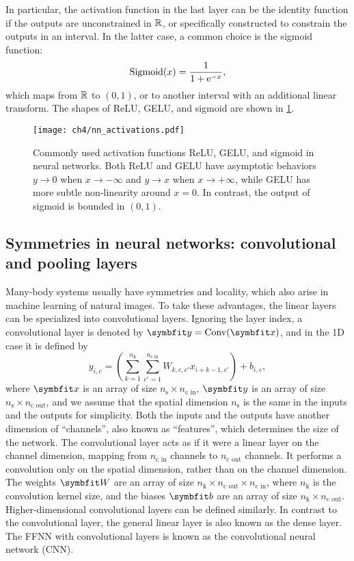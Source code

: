 In particular, the activation function in the last layer can be the identity function if the outputs are unconstrained in $\mathbb{R}$, or specifically constructed to constrain the outputs in an interval. In the latter case, a common choice is the sigmoid function:
\begin{equation}
\text{Sigmoid}(x) = \frac{1}{1 + \mathrm{e}^{-x}},
\label{eq:sigmoid}
\end{equation}
which maps from $\mathbb{R}$ to $(0, 1)$, or to another interval with an additional linear transform. The shapes of ReLU, GELU, and sigmoid are shown in \cref{fig:activations}.

\begin{figure}[htb]
\centering
\texttt{[image: ch4/nn\_activations.pdf]}
\caption[Commonly used activation functions in neural networks]{
Commonly used activation functions ReLU, GELU, and sigmoid in neural networks.
Both ReLU and GELU have asymptotic behaviors $y \to 0$ when $x \to -\infty$ and $y \to x$ when $x \to +\infty$, while GELU has more subtle non-linearity around $x = 0$.
In contrast, the output of sigmoid is bounded in $(0, 1)$.
}
\label{fig:activations}
\end{figure}

\subsection{Symmetries in neural networks: convolutional and pooling layers}

Many-body systems usually have symmetries and locality, which also arise in machine learning of natural images. To take these advantages, the linear layers can be specialized into convolutional layers. Ignoring the layer index, a convolutional layer is denoted by $\vy = \text{Conv}(\vx)$, and in the 1D case it is defined by
\begin{equation}
y_{i, c} = \left( \sum_{k = 1}^{n_\text{k}} \sum_{c' = 1}^{n_\text{c in}} W_{k, c, c'} x_{i + k - 1, c'} \right) + b_{i, c},
\label{eq:conv-layer}
\end{equation}
where $\vx$ is an array of size $n_\text{s} \times n_\text{c in}$, $\vy$ is an array of size $n_\text{s} \times n_\text{c out}$, and we assume that the spatial dimension $n_\text{s}$ is the same in the inputs and the outputs for simplicity. Both the inputs and the outputs have another dimension of ``channels'', also known as ``features'', which determines the size of the network. The convolutional layer acts as if it were a linear layer on the channel dimension, mapping from $n_\text{c in}$ channels to $n_\text{c out}$ channels. It performs a convolution only on the spatial dimension, rather than on the channel dimension. The weights $\mW$ are an array of size $n_\text{k} \times n_\text{c out} \times n_\text{c in}$, where $n_\text{k}$ is the convolution kernel size, and the biases $\vb$ are an array of size $n_\text{k} \times n_\text{c out}$. Higher-dimensional convolutional layers can be defined similarly. In contrast to the convolutional layer, the general linear layer is also known as the dense layer. The FFNN with convolutional layers is known as the convolutional neural network (CNN).

